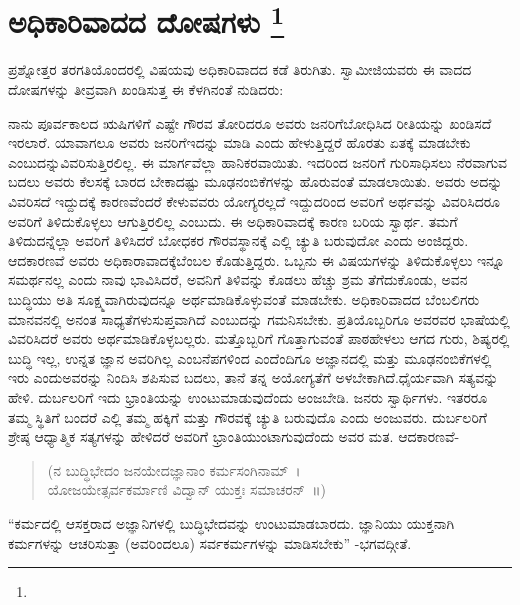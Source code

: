 
\vspace{-0.6cm}

\chapter[ಅಧಿಕಾರಿವಾದದ ದೋಷಗಳು ]{ಅಧಿಕಾರಿವಾದದ ದೋಷಗಳು \protect\footnote{}}

ಪ್ರಶ್ನೋತ್ತರ ತರಗತಿಯೊಂದರಲ್ಲಿ ವಿಷಯವು ಅಧಿಕಾರಿವಾದದ ಕಡೆ ತಿರುಗಿತು. ಸ್ವಾಮೀಜಿಯವರು ಈ ವಾದದ ದೋಷಗಳನ್ನು ತೀವ್ರವಾಗಿ ಖಂಡಿಸುತ್ತ ಈ ಕೆಳಗಿನಂತೆ ನುಡಿದರು:

ನಾನು ಪೂರ್ವಕಾಲದ ಋಷಿಗಳಿಗೆ ಎಷ್ಟೇ ಗೌರವ ತೋರಿದರೂ ಅವರು ಜನರಿಗೆ\break ಬೋಧಿಸಿದ ರೀತಿಯನ್ನು ಖಂಡಿಸದೆ ಇರಲಾರೆ. ಯಾವಾಗಲೂ ಅವರು ಜನರಿಗೆ\break ಇದನ್ನು ಮಾಡಿ ಎಂದು ಹೇಳುತ್ತಿದ್ದರೆ ಹೊರತು ಏತಕ್ಕೆ ಮಾಡಬೇಕು ಎಂಬುದನ್ನು\break ವಿವರಿಸುತ್ತಿರಲಿಲ್ಲ. ಈ ಮಾರ್ಗವೆಲ್ಲಾ ಹಾನಿಕರವಾಯಿತು. ಇದರಿಂದ ಜನರಿಗೆ ಗುರಿ\break ಸಾಧಿಸಲು ನೆರವಾಗುವ ಬದಲು ಅವರು ಕೆಲಸಕ್ಕೆ ಬಾರದ ಬೇಕಾದಷ್ಟು ಮೂಢನಂಬಿಕೆಗಳನ್ನು ಹೊರುವಂತೆ ಮಾಡಲಾಯಿತು. ಅವರು ಅದನ್ನು ವಿವರಿಸದೆ ಇದ್ದುದಕ್ಕೆ ಕಾರಣವೆಂದರೆ ಕೇಳುವವರು ಯೋಗ್ಯರಲ್ಲದೆ ಇದ್ದುದರಿಂದ ಅವರಿಗೆ ಅರ್ಥವನ್ನು ವಿವರಿಸಿದರೂ ಅವರಿಗೆ ತಿಳಿದುಕೊಳ್ಳಲು ಆಗುತ್ತಿರಲಿಲ್ಲ ಎಂಬುದು. ಈ ಅಧಿಕಾರಿವಾದಕ್ಕೆ ಕಾರಣ ಬರಿಯ ಸ್ವಾರ್ಥ. ತಮಗೆ ತಿಳಿದುದನ್ನೆಲ್ಲಾ ಅವರಿಗೆ ತಿಳಿಸಿದರೆ ಬೋಧಕರ ಗೌರವಸ್ಥಾನಕ್ಕೆ ಎಲ್ಲಿ ಚ್ಯುತಿ ಬರುವುದೋ ಎಂದು ಅಂಜಿದ್ದರು. ಆದಕಾರಣವೆ ಅವರು ಅಧಿಕಾರಾವಾದಕ್ಕೆ\break ಬೆಂಬಲ ಕೊಡುತ್ತಿದ್ದರು. ಒಬ್ಬನು ಈ ವಿಷಯಗಳನ್ನು ತಿಳಿದುಕೊಳ್ಳಲು ಇನ್ನೂ ಸಮರ್ಥನಲ್ಲ ಎಂದು ನಾವು ಭಾವಿಸಿದರೆ, ಅವನಿಗೆ ತಿಳಿವನ್ನು ಕೊಡಲು ಹೆಚ್ಚು ಶ್ರಮ ತೆಗೆದುಕೊಂಡು, ಅವನ ಬುದ್ಧಿಯು ಅತಿ ಸೂಕ್ಷ್ಮವಾಗಿರುವುದನ್ನೂ ಅರ್ಥಮಾಡಿಕೊಳ್ಳುವಂತೆ ಮಾಡಬೇಕು. ಅಧಿಕಾರಿ\-ವಾದದ ಬೆಂಬಲಿಗರು ಮಾನವನಲ್ಲಿ ಅನಂತ ಸಾಧ್ಯತೆಗಳು\break ಸುಪ್ತವಾಗಿದೆ ಎಂಬುದನ್ನು ಗಮನಿಸಬೇಕು. ಪ್ರತಿಯೊಬ್ಬರಿಗೂ ಅವರವರ ಭಾಷೆಯಲ್ಲಿ ವಿವರಿಸಿದರೆ ಅವರು ಅರ್ಥಮಾಡಿಕೊಳ್ಳಬಲ್ಲರು. ಮತ್ತೊಬ್ಬರಿಗೆ ಗೊತ್ತಾಗುವಂತೆ ಪಾಠ\break ಹೇಳಲು ಆಗದ ಗುರು, ಶಿಷ್ಯರಲ್ಲಿ ಬುದ್ಧಿ ಇಲ್ಲ, ಉನ್ನತ ಜ್ಞಾನ ಅವರಿಗಿಲ್ಲ ಎಂಬ\break ನೆಪಗಳಿಂದ ಎಂದೆಂದಿಗೂ ಅಜ್ಞಾನದಲ್ಲಿ ಮತ್ತು ಮೂಢನಂಬಿಕೆಗಳಲ್ಲಿ ಇರು ಎಂದು\break ಅವರನ್ನು ನಿಂದಿಸಿ ಶಪಿಸುವ ಬದಲು, ತಾನೆ ತನ್ನ ಅಯೋಗ್ಯತೆಗೆ ಅಳಬೇಕಾಗಿದೆ.\break ಧೈರ್ಯವಾಗಿ ಸತ್ಯವನ್ನು ಹೇಳಿ. ದುರ್ಬಲರಿಗೆ ಇದು ಭ್ರಾಂತಿಯನ್ನು ಉಂಟುಮಾಡುವುದೆಂದು ಅಂಜಬೇಡಿ. ಜನರು ಸ್ವಾರ್ಥಿಗಳು. ಇತರರೂ ತಮ್ಮ ಸ್ಥಿತಿಗೆ ಬಂದರೆ ಎಲ್ಲಿ ತಮ್ಮ ಹಕ್ಕಿಗೆ ಮತ್ತು ಗೌರವಕ್ಕೆ ಚ್ಯುತಿ ಬರುವುದೊ ಎಂದು ಅಂಜುವರು. ದುರ್ಬಲರಿಗೆ ಶ್ರೇಷ್ಠ ಆಧ್ಯಾತ್ಮಿಕ ಸತ್ಯಗಳನ್ನು ಹೇಳಿದರೆ ಅವರಿಗೆ ಭ್ರಾಂತಿಯುಂಟಾಗುವುದೆಂದು ಅವರ ಮತ. ಆದಕಾರಣವೆ-

\begin{verse}
 (ನ ಬುದ್ಧಿಭೇದಂ ಜನಯೇದಜ್ಞಾನಾಂ ಕರ್ಮಸಂಗಿನಾಮ್​~।\\
 ಯೋಜಯೇತ್ಸರ್ವಕರ್ಮಾಣಿ ವಿದ್ವಾನ್​ ಯುಕ್ತಃ ಸಮಾಚರನ್​~॥)
\end{verse}

“ಕರ್ಮದಲ್ಲಿ ಆಸಕ್ತರಾದ ಅಜ್ಞಾನಿಗಳಲ್ಲಿ ಬುದ್ಧಿಭೇದವನ್ನು ಉಂಟುಮಾಡಬಾರದು. ಜ್ಞಾನಿಯು ಯುಕ್ತನಾಗಿ ಕರ್ಮಗಳನ್ನು ಆಚರಿಸುತ್ತಾ (ಅವರಿಂದಲೂ) ಸರ್ವಕರ್ಮಗಳನ್ನು ಮಾಡಿಸಬೇಕು” -ಭಗವದ್ಗೀತೆ.

